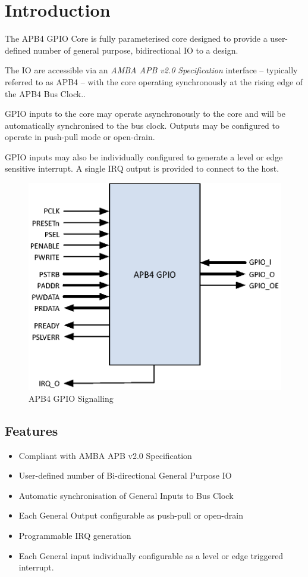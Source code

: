 \chapter{Introduction} \label{introduction}

The APB4 GPIO Core is fully parameterised core designed to provide a user-defined number of general purpose, bidirectional IO to a design.

The IO are accessible via an \emph{AMBA APB v2.0 Specification} interface -- typically referred to as APB4 -- with the core operating synchronously at the rising edge of the APB4 Bus Clock..

GPIO inputs to the core may operate asynchronously to the core and will be automatically synchronised to the bus clock. Outputs may be configured to operate in push-pull mode or open-drain.

GPIO inputs may also be individually configured to generate a level or edge sensitive interrupt. A single IRQ output is provided to connect to the host.

\begin{figure}[tbh]
	\centering
	\includegraphics{assets/img/apb4-gpio-sig}
	\caption{APB4 GPIO Signalling}
	\label{fig:apb4-gpio-sig}
\end{figure}

\section{Features}\label{features}

\begin{itemize}
\item
  Compliant with AMBA APB v2.0 Specification
\item
  User-defined number of Bi-directional General Purpose IO
\item
  Automatic synchronisation of General Inputs to Bus Clock
\item
  Each General Output configurable as push-pull or open-drain
\item
  Programmable IRQ generation
\item
  Each General input individually configurable as a level or edge triggered interrupt.
\end{itemize}
